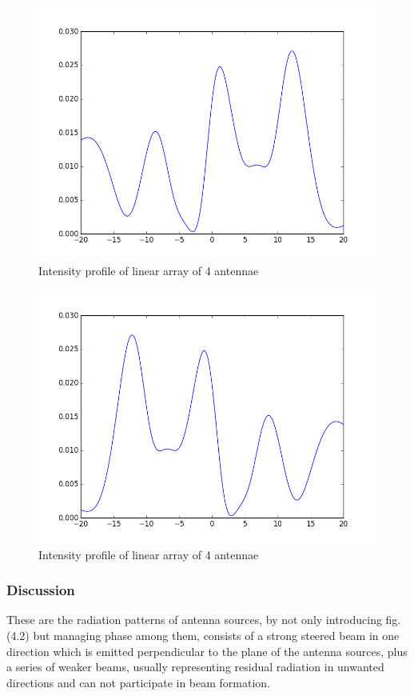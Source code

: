 \begin{figure}[!h]
	\centering	
	\includegraphics[scale=0.45]{figure_3.png}
	\caption{Intensity profile of linear array of 4 antennae}
\end{figure}

\begin{figure}[!h]
	\centering	
	\includegraphics[scale=0.45]{figure_4.png}
	\caption{Intensity profile of linear array of 4 antennae}
\end{figure}

\subsubsection{Discussion}
These are the radiation patterns of antenna sources, by not only introducing fig. (4.2) but managing phase among them, consists of a strong steered beam in one direction which is emitted perpendicular to the plane of the antenna sources, plus a series of weaker beams, usually representing residual radiation in unwanted directions and can not participate in beam formation.

